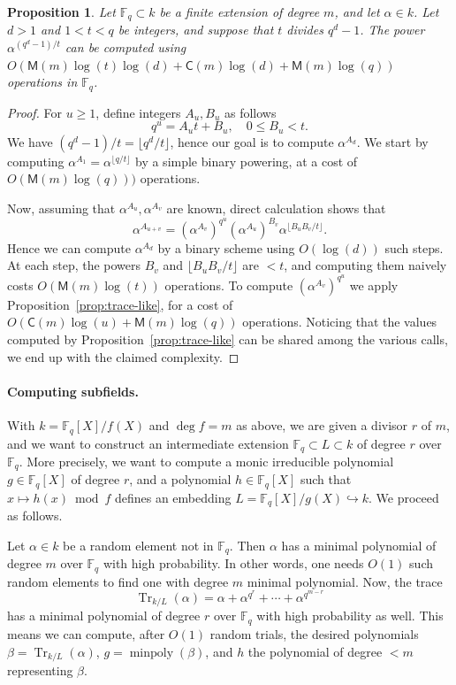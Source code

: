 \documentclass[12pt]{article}
\theoremstyle{plain}
\newtheorem{proposition}[theorem]{Proposition}
\theoremstyle{definition}
\DeclareMathOperator{\trace}{Tr} %
\DeclareMathOperator{\minpoly}{minpoly}
\def\F{\ensuremath{\mathbb{F}}}
\def\MM{\ensuremath{\mathsf{M}}}
\def\CC{\ensuremath{\mathsf{C}}}
\begin{document}
\begin{proposition}
  \label{prop:large-power}
  Let $\F_q \subset k$ be a finite extension of degree $m$, and let
  $\alpha\in k$. Let $d>1$ and $1<t<q$ be integers, and suppose that
  $t$ divides $q^d-1$. The power $\alpha^{(q^d-1)/t}$ can be computed
  using $O(\MM(m)\log(t)\log(d) + \CC(m)\log(d) + \MM(m)\log(q))$
  operations in $\F_q$.
\end{proposition}
\begin{proof}
  For $u \ge 1$, define integers $A_u, B_u$ as follows
  \begin{equation*}
    q^u = A_ut + B_u, \quad 0\le B_u < t.
  \end{equation*}
  We have $(q^d-1)/t = \lfloor q^d / t \rfloor$, hence our goal is to
  compute $\alpha^{A_d}$. We start by computing
  $\alpha^{A_1} = \alpha^{\lfloor q / t\rfloor}$ by a simple binary
  powering, at a cost of $O(\MM(m)\log(q)))$ operations.

  Now, assuming that $\alpha^{A_u}, \alpha^{A_v}$ are known, direct
  calculation shows that
  \[ \alpha^{A_{u + v}} = 
    \left(\alpha^{A_v}\right)^{q^u}\left(\alpha^{A_u}\right)^{B_v}\alpha^{\lfloor B_uB_v / t \rfloor}. 
  \]
  Hence we can compute $\alpha^{A_d}$ by a binary scheme using
  $O(\log(d))$ such steps. %
  At each step, the powers $B_v$ and $\lfloor B_uB_v / t \rfloor$ are
  $<t$, and computing them naively costs $O(\MM(m)\log(t))$
  operations. %
  To compute $\left(\alpha^{A_v}\right)^{q^u}$ we apply
  Proposition~\ref{prop:trace-like}, for a cost of
  $O(\CC(m)\log(u) + \MM(m)\log(q))$ operations. %
  Noticing that the values computed by Proposition~\ref{prop:trace-like} can
  be shared among the various calls, we end up with the claimed
  complexity.
\end{proof}


\paragraph{Computing subfields.}
With $k = \F_q[X]/f(X)$ and $\deg f=m$ as above, we are given a
divisor $r$ of $m$, and we want to construct an intermediate extension
$\F_q \subset L \subset k$ of degree $r$ over $\F_q$. More precisely,
we want to compute a monic irreducible polynomial $g \in \F_q[X]$ of
degree $r$, and a polynomial $h \in \F_q[X]$ such that
$x \mapsto h(x)\bmod f$ defines an embedding
$L = \F_q[X] / g(X) \hookrightarrow k$. We proceed as follows.

Let $\alpha\in k$ be a random element not in $\F_q$. Then $\alpha$ has a minimal polynomial of degree $m$ 
over $\F_q$ with high probability. In other words, one needs $O(1)$ such random elements to find 
one with degree $m$ minimal polynomial. Now, the trace
\begin{equation}
	\label{equ:trace-simple}
	\trace_{k/L}(\alpha) = \alpha + \alpha^{q^r} + \cdots + \alpha^{q^{m - r}}
\end{equation}
has a minimal polynomial of degree $r$ over $\F_q$ with high
probability as well. This means we can compute, after $O(1)$ random
trials, the desired polynomials $\beta = \trace_{k/L}(\alpha)$,
$g = \minpoly(\beta)$, and $h$ the polynomial of degree $<m$ representing $\beta$.
\end{document}
